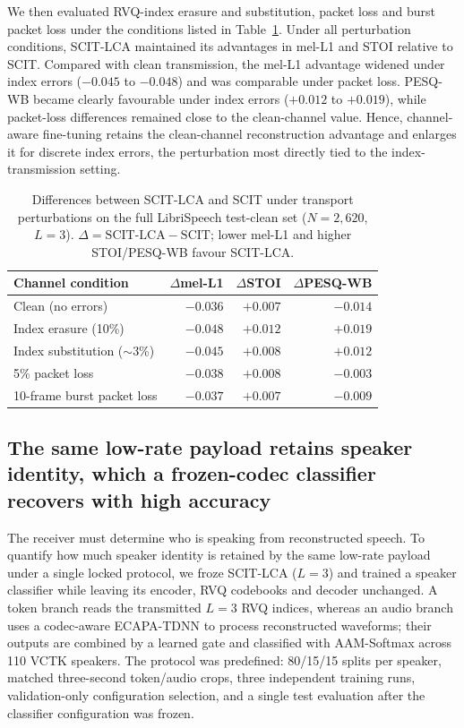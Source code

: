 \documentclass[final,5p,times,twocolumn]{elsarticle}
\begin{document}
We then evaluated RVQ-index erasure and substitution, packet loss and burst packet loss under the conditions listed in Table~\ref{tab:robustness}. Under all perturbation conditions, SCIT-LCA maintained its advantages in mel-L1 and STOI relative to SCIT. Compared with clean transmission, the mel-L1 advantage widened under index errors ($-0.045$ to $-0.048$) and was comparable under packet loss. PESQ-WB became clearly favourable under index errors ($+0.012$ to $+0.019$), while packet-loss differences remained close to the clean-channel value. Hence, channel-aware fine-tuning retains the clean-channel reconstruction advantage and enlarges it for discrete index errors, the perturbation most directly tied to the index-transmission setting.

\begin{table}[t]
\centering
\caption{Differences between SCIT-LCA and SCIT under transport perturbations on the full LibriSpeech test-clean set ($N=2{,}620$, $L=3$). $\Delta=\mathrm{SCIT\text{-}LCA}-\mathrm{SCIT}$; lower mel-L1 and higher STOI/PESQ-WB favour SCIT-LCA.}
\label{tab:robustness}
\small\setlength{\tabcolsep}{4pt}
\begin{tabular}{lrrr}
\toprule
Channel condition & $\Delta$mel-L1 & $\Delta$STOI & $\Delta$PESQ-WB\\
\midrule
Clean (no errors) & $-0.036$ & $+0.007$ & $-0.014$\\
Index erasure (10\%) & $-0.048$ & $+0.012$ & $+0.019$\\
Index substitution ($\sim$3\%) & $-0.045$ & $+0.008$ & $+0.012$\\
5\% packet loss & $-0.038$ & $+0.008$ & $-0.003$\\
10-frame burst packet loss & $-0.037$ & $+0.007$ & $-0.009$\\
\bottomrule
\end{tabular}
\end{table}

\subsection{The same low-rate payload retains speaker identity, which a frozen-codec classifier recovers with high accuracy}
The receiver must determine who is speaking from reconstructed speech. To quantify how much speaker identity is retained by the same low-rate payload under a single locked protocol, we froze SCIT-LCA ($L=3$) and trained a speaker classifier while leaving its encoder, RVQ codebooks and decoder unchanged. A token branch reads the transmitted $L=3$ RVQ indices, whereas an audio branch uses a codec-aware ECAPA-TDNN to process reconstructed waveforms; their outputs are combined by a learned gate and classified with AAM-Softmax across 110 VCTK speakers. The protocol was predefined: 80/15/15 splits per speaker, matched three-second token/audio crops, three independent training runs, validation-only configuration selection, and a single test evaluation after the classifier configuration was frozen.
\end{document}
